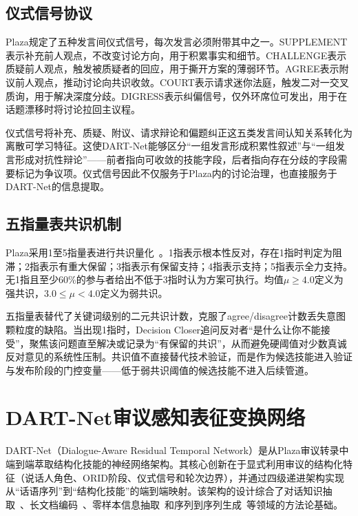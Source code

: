 \documentclass[12pt,a4paper]{ctexart}
\begin{document}
\subsection{仪式信号协议}

Plaza规定了五种发言间仪式信号，每次发言必须附带其中之一。SUPPLEMENT表示补充前人观点，不改变讨论方向，用于积累事实和细节。CHALLENGE表示质疑前人观点，触发被质疑者的回应，用于撕开方案的薄弱环节。AGREE表示附议前人观点，推动讨论向共识收敛。COURT表示请求迷你法庭，触发二对一交叉质询，用于解决深度分歧。DIGRESS表示纠偏信号，仅外环席位可发出，用于在话题漂移时将讨论拉回主议程。

仪式信号将补充、质疑、附议、请求辩论和偏题纠正这五类发言间认知关系转化为离散可学习特征。这使DART-Net能够区分“一组发言形成积累性叙述”与“一组发言形成对抗性辩论”——前者指向可收敛的技能字段，后者指向存在分歧的字段需要标记为争议项。仪式信号因此不仅服务于Plaza内的讨论治理，也直接服务于DART-Net的信息提取。

\subsection{五指量表共识机制}

Plaza采用1至5指量表进行共识量化~\cite{lippincott2025fuzzy}。1指表示根本性反对，存在1指时判定为阻滞；2指表示有重大保留；3指表示有保留支持；4指表示支持；5指表示全力支持。无1指且至少60\%的参与者给出不低于3指时认为方案可执行。均值$\mu \geq 4.0$定义为强共识，$3.0 \leq \mu < 4.0$定义为弱共识。

五指量表替代了关键词级别的二元共识计数，克服了agree/disagree计数丢失意图颗粒度的缺陷。当出现1指时，Decision Closer追问反对者“是什么让你不能接受”，聚焦该问题直至解决或记录为“有保留的共识”，从而避免硬阈值对少数真诚反对意见的系统性压制。共识值不直接替代技术验证，而是作为候选技能进入验证与发布阶段的门控变量——低于弱共识阈值的候选技能不进入后续管道。

\section{DART-Net审议感知表征变换网络}

DART-Net（Dialogue-Aware Residual Temporal Network）是从Plaza审议转录中端到端萃取结构化技能的神经网络架构。其核心创新在于显式利用审议的结构化特征（说话人角色、ORID阶段、仪式信号和轮次边界），并通过四级递进架构实现从“话语序列”到“结构化技能”的端到端映射。该架构的设计综合了对话知识抽取~\cite{yu2022d2k}、长文档编码~\cite{beltagy2020longformer}、零样本信息抽取~\cite{sainz2023gollie}和序列到序列生成~\cite{lewis2019bart}等领域的方法论基础。
\end{document}
